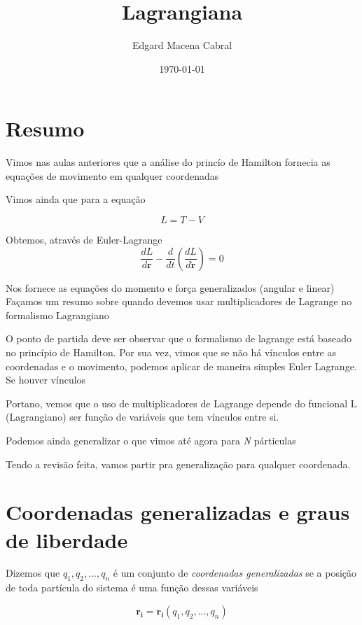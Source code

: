 \documentclass[11pt]{article}
\author{Edgard Macena Cabral}
\date{\today}
\title{Lagrangiana}
\begin{document}
\maketitle
\tableofcontents




\section{Resumo}
\label{sec:orgab3b1c9}
Vimos nas aulas anteriores que a análise do princío de Hamilton fornecia as equações de movimento em qualquer coordenadas

Vimos ainda que para a equação

\begin{equation}
 L = T - V
\end{equation}

Obtemos, através de Euler-Lagrange
\begin{equation}\label{eq:Euler-Lagrange}
\label{eq:orgcc08765}
\frac{dL}{d\mathbf{r}} - \frac{d}{dt}\left(\dfrac{dL}{d\mathbf{\dot{r}}}\right) = 0
\end{equation}

Nos fornece as equações do momento e força generalizados (angular e linear)
Façamos um resumo sobre quando devemos usar multiplicadores de Lagrange no
formalismo Lagrangiano

O ponto de partida deve ser observar que o formalismo de lagrange está
baseado no princípio de Hamilton. Por sua vez, vimos que se não há vínculos
entre as coordenadas e o movimento, podemos aplicar de maneira simples Euler
Lagrange. Se houver vínculos

Portano, vemos que o uso de multiplicadores de Lagrange depende do funcional
L (Lagrangiano) ser função de variáveis que tem vínculos entre si.

Podemos ainda generalizar o que vimos até agora para \emph{N} párticulas

Tendo a revisão feita, vamos partir pra generalização para qualquer
coordenada.


\section{Coordenadas generalizadas e graus de liberdade}
\label{sec:org89ff88e}
Dizemos que \(q_1, q_2, ..., q_n\) é um conjunto de \emph{coordenadas generalizadas} se
a posição de toda partícula do sistema é uma função dessas variáveis

\begin{equation}\label{eq:coordenadas generalizadas}
\mathbf{r_i} = \mathbf{r_i}(q_1, q_2, ..., q_n)
\end{equation}
\end{document}
